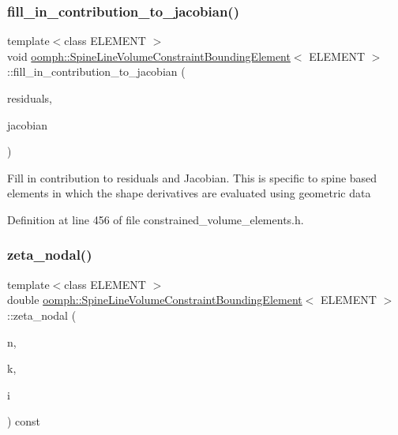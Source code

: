 \subsubsection{\texorpdfstring{fill\+\_\+in\+\_\+contribution\+\_\+to\+\_\+jacobian()}{fill\_in\_contribution\_to\_jacobian()}}
{\footnotesize\ttfamily template$<$class E\+L\+E\+M\+E\+NT $>$ \\
void \hyperlink{classoomph_1_1SpineLineVolumeConstraintBoundingElement}{oomph\+::\+Spine\+Line\+Volume\+Constraint\+Bounding\+Element}$<$ E\+L\+E\+M\+E\+NT $>$\+::fill\+\_\+in\+\_\+contribution\+\_\+to\+\_\+jacobian (\begin{DoxyParamCaption}\item[{Vector$<$ double $>$ \&}]{residuals,  }\item[{Dense\+Matrix$<$ double $>$ \&}]{jacobian }\end{DoxyParamCaption})\hspace{0.3cm}{\ttfamily [inline]}}

Fill in contribution to residuals and Jacobian. This is specific to spine based elements in which the shape derivatives are evaluated using geometric data 

Definition at line 456 of file constrained\+\_\+volume\+\_\+elements.\+h.

\mbox{\label{classoomph_1_1SpineLineVolumeConstraintBoundingElement_ab299a1b0cec3d35f5bd6ef683a244db6}} 
\subsubsection{\texorpdfstring{zeta\+\_\+nodal()}{zeta\_nodal()}}
{\footnotesize\ttfamily template$<$class E\+L\+E\+M\+E\+NT $>$ \\
double \hyperlink{classoomph_1_1SpineLineVolumeConstraintBoundingElement}{oomph\+::\+Spine\+Line\+Volume\+Constraint\+Bounding\+Element}$<$ E\+L\+E\+M\+E\+NT $>$\+::zeta\+\_\+nodal (\begin{DoxyParamCaption}\item[{const unsigned \&}]{n,  }\item[{const unsigned \&}]{k,  }\item[{const unsigned \&}]{i }\end{DoxyParamCaption}) const\hspace{0.3cm}{\ttfamily [inline]}}



